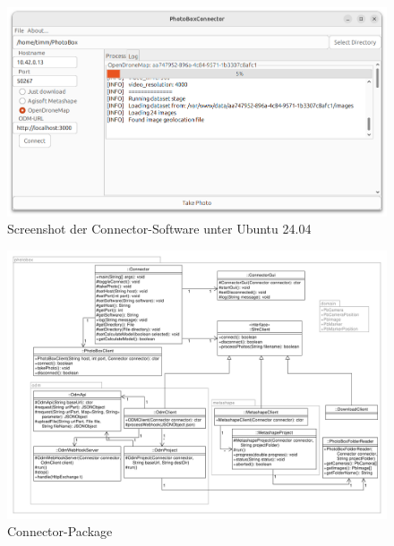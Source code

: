 \documentclass[./00PhotoBox.tex]{subfiles}
\begin{document}

\begin{figure}
  \centering
  \includegraphics[width=1\textwidth]{./img/connector_screenshot.png}
  \caption{Screenshot der Connector-Software unter Ubuntu 24.04} %
  \label{img:screenshot_connector} %
\end{figure}

\begin{figure}
  \centering
  \includegraphics[width=1\textwidth]{./img/uml/uml_connector_classdiagramm.pdf}
  \caption{Connector-Package} %
  \label{img:uml_connector} %
\end{figure}

\biblio
\end{document}
